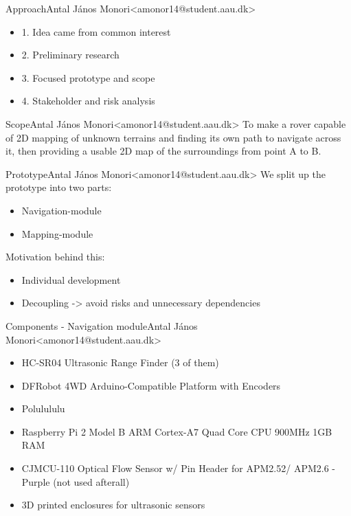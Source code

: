 \begin{frame}{Approach}{Antal János Monori\newline<amonor14@student.aau.dk>}
	\begin{itemize}
		\item 1. Idea came from common interest
		\item 2. Preliminary research
		\item 3. Focused prototype and scope
		\item 4. Stakeholder and risk analysis
	\end{itemize}
\end{frame}

\begin{frame}{Scope}{Antal János Monori\newline<amonor14@student.aau.dk>}
	To make a rover capable of 2D mapping of unknown terrains and finding its own path to navigate across it, then providing a usable 2D map of the surroundings from point A to B.
\end{frame}

\begin{frame}{Prototype}{Antal János Monori\newline<amonor14@student.aau.dk>}
	We split up the prototype into two parts:
	\begin{itemize}
		\item Navigation-module
		\item Mapping-module
	\end{itemize}
	Motivation behind this:
	\begin{itemize}
		\item Individual development
		\item Decoupling -> avoid risks and unnecessary dependencies
	\end{itemize}
\end{frame}

\begin{frame}{Components - Navigation module}{Antal János Monori\newline<amonor14@student.aau.dk>}
	\begin{itemize}
		\item HC-SR04 Ultrasonic Range Finder (3 of them)
		\item DFRobot 4WD Arduino-Compatible Platform with Encoders
		\item Polulululu		
		\item Raspberry Pi 2 Model B ARM Cortex-A7 Quad Core CPU 900MHz 1GB RAM 
		\item CJMCU-110 Optical Flow Sensor w/ Pin Header for APM2.52/ APM2.6 - Purple	(not used afterall)
		\item 3D printed enclosures for ultrasonic sensors
	\end{itemize}
\end{frame}

